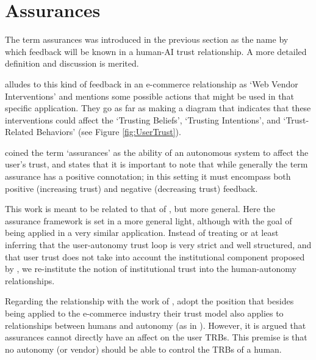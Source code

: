 \section{Assurances}
    The term assurances was introduced in the previous section as the name by which feedback will be known in a human-AI trust relationship. A more detailed definition and discussion is merited.

    \citet{McKnight2001-fa} alludes to this kind of feedback in an e-commerce relationship as `Web Vendor Interventions' and mentions some possible actions that might be used in that specific application. They go as far as making a diagram that indicates that these interventions could affect the `Trusting Beliefs', `Trusting Intentions', and `Trust-Related Behaviors' (see Figure \ref{fig:UserTrust}).
    
    \citet{Lillard2016-yg} coined the term `assurances' as the ability of an autonomous system to affect the user's trust, and states that it is important to note that while generally the term assurance has a positive connotation; in this setting it must encompass both positive (increasing trust) and negative (decreasing trust) feedback.

    This work is meant to be related to that of \citet{Lillard2016-yg}, but more general. Here the assurance framework is set in a more general light, although with the goal of being applied in a very similar application. Instead of treating or at least inferring that the user-autonomy trust loop is very strict and well structured, and that user trust does not take into account the institutional component proposed by \citet{McKnight2001-fa}, we re-institute the notion of institutional trust into the human-autonomy relationships.

    Regarding the relationship with the work of \citet{McKnight2001-fa}, adopt the position that besides being applied to the e-commerce industry their trust model also applies to relationships between humans and autonomy (as in \citet{Lillard2016-yg}). However, it is argued that assurances cannot directly have an affect on the user TRBs. This premise is that no autonomy (or vendor) should be able to control the TRBs of a human.

